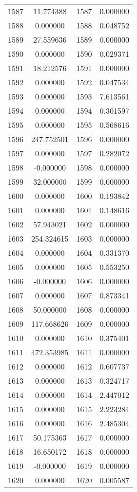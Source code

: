 \documentclass[12pt]{article}
\begin{document}
\begin{longtable}{@{}cccc@{}}
1587 & 11.774388 & 1587 & 0.000000 \\
1588 & 0.000000 & 1588 & 0.048752 \\
1589 & 27.559636 & 1589 & 0.000000 \\
1590 & 0.000000 & 1590 & 0.029371 \\
1591 & 18.212576 & 1591 & 0.000000 \\
1592 & 0.000000 & 1592 & 0.047534 \\
1593 & 0.000000 & 1593 & 7.613561 \\
1594 & 0.000000 & 1594 & 0.301597 \\
1595 & 0.000000 & 1595 & 0.568616 \\
1596 & 247.752501 & 1596 & 0.000000 \\
1597 & 0.000000 & 1597 & 0.282072 \\
1598 & -0.000000 & 1598 & 0.000000 \\
1599 & 32.000000 & 1599 & 0.000000 \\
1600 & 0.000000 & 1600 & 0.193842 \\
1601 & 0.000000 & 1601 & 0.148616 \\
1602 & 57.943021 & 1602 & 0.000000 \\
1603 & 254.324615 & 1603 & 0.000000 \\
1604 & 0.000000 & 1604 & 0.331370 \\
1605 & 0.000000 & 1605 & 0.553250 \\
1606 & -0.000000 & 1606 & 0.000000 \\
1607 & 0.000000 & 1607 & 0.873341 \\
1608 & 50.000000 & 1608 & 0.000000 \\
1609 & 117.668626 & 1609 & 0.000000 \\
1610 & 0.000000 & 1610 & 0.375401 \\
1611 & 472.353985 & 1611 & 0.000000 \\
1612 & 0.000000 & 1612 & 0.607737 \\
1613 & 0.000000 & 1613 & 0.324717 \\
1614 & 0.000000 & 1614 & 2.447012 \\
1615 & 0.000000 & 1615 & 2.223284 \\
1616 & 0.000000 & 1616 & 2.485304 \\
1617 & 50.175363 & 1617 & 0.000000 \\
1618 & 16.650172 & 1618 & 0.000000 \\
1619 & -0.000000 & 1619 & 0.000000 \\
1620 & 0.000000 & 1620 & 0.005587 \\

\end{longtable}
\end{document}
